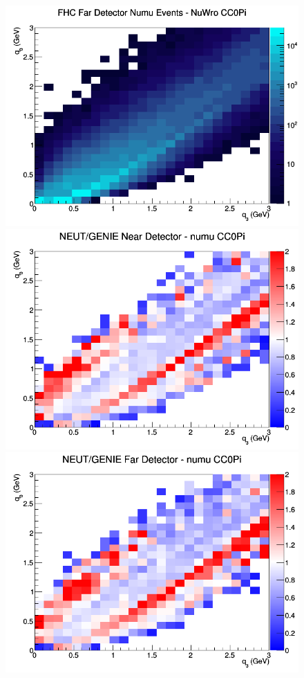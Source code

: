 \begin{figure}[h]
\endminipage
{}
\includegraphics[width=\linewidth]{eff_q0_q3/GAr/CC0Pi_FHC_FD_numu_q3_q0_NuWro.png}
\endminipage
\newline
{}
\includegraphics[width=\linewidth]{eff_q0_q3/GAr/ratios/CC0Pi_NEUT_GENIE_numu_near_q3_q0.png}
\endminipage
{}
\includegraphics[width=\linewidth]{eff_q0_q3/GAr/ratios/CC0Pi_NEUT_GENIE_numu_far_q3_q0.png}

\end{figure}
